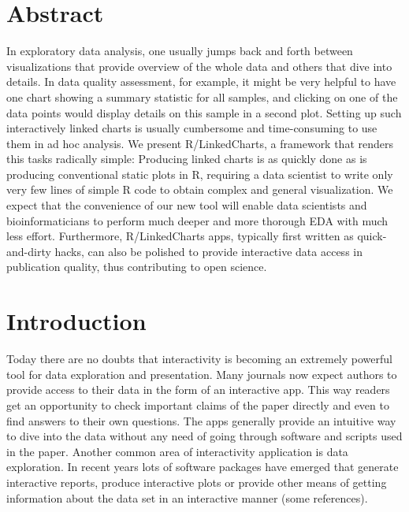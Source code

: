 \documentclass[twocolumn,10pt]{article}
\begin{document}
\setcounter{secnumdepth}{0}



\section{Abstract}
In exploratory data analysis, one usually jumps back and forth between visualizations that provide overview of the whole data and others that dive into details. In data quality assessment, for example, it might be very helpful to have one chart showing a summary statistic for all samples, and clicking on one of the data points would display details on this sample in a second plot. Setting up such interactively linked charts is usually cumbersome and time-consuming to use them in ad hoc analysis. We present R/LinkedCharts, a framework  that renders this tasks radically simple: Producing linked charts is as quickly done as is producing conventional static plots in R, requiring a data scientist to write only very few lines of simple R code to obtain complex and general visualization. We expect that the convenience of our new tool will enable data scientists and bioinformaticians to perform much deeper and more thorough EDA with much less effort. Furthermore, R/LinkedCharts apps, typically first written as quick-and-dirty hacks, can also be polished to provide interactive data access in publication quality, thus contributing to open science.

\section{Introduction}
Today there are no doubts that interactivity is becoming an extremely powerful tool for data exploration and presentation. Many journals now expect authors to provide access to their data in the form of an interactive app. This way readers get an opportunity to check important claims of the paper directly and even to find answers to their own questions. The apps generally provide an intuitive way to dive into the data without any need of going through software and scripts used in the paper. Another common area of interactivity application is data exploration. In recent years lots of software packages have emerged that generate interactive reports, produce interactive plots or provide other means of getting information about the data set in an interactive manner (some references).
\end{document}
